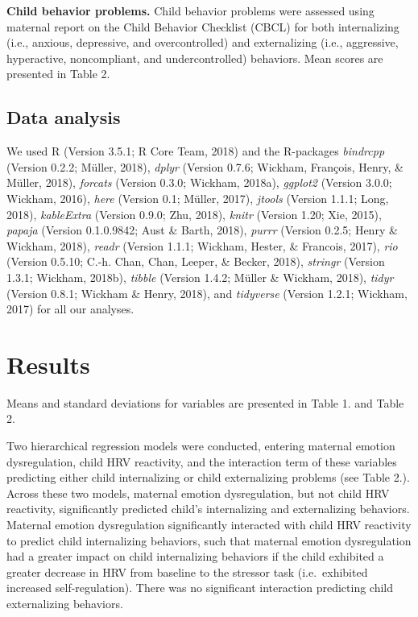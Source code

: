\documentclass[man]{apa6}
\begin{document}
\textbf{Child behavior problems.} Child behavior problems were assessed
using maternal report on the Child Behavior Checklist (CBCL) for both
internalizing (i.e., anxious, depressive, and overcontrolled) and
externalizing (i.e., aggressive, hyperactive, noncompliant, and
undercontrolled) behaviors. Mean scores are presented in Table 2.

\subsection{Data analysis}\label{data-analysis}

We used R (Version 3.5.1; R Core Team, 2018) and the R-packages
\emph{bindrcpp} (Version 0.2.2; Müller, 2018), \emph{dplyr} (Version
0.7.6; Wickham, François, Henry, \& Müller, 2018), \emph{forcats}
(Version 0.3.0; Wickham, 2018a), \emph{ggplot2} (Version 3.0.0; Wickham,
2016), \emph{here} (Version 0.1; Müller, 2017), \emph{jtools} (Version
1.1.1; Long, 2018), \emph{kableExtra} (Version 0.9.0; Zhu, 2018),
\emph{knitr} (Version 1.20; Xie, 2015), \emph{papaja} (Version
0.1.0.9842; Aust \& Barth, 2018), \emph{purrr} (Version 0.2.5; Henry \&
Wickham, 2018), \emph{readr} (Version 1.1.1; Wickham, Hester, \&
Francois, 2017), \emph{rio} (Version 0.5.10; C.-h. Chan, Chan, Leeper,
\& Becker, 2018), \emph{stringr} (Version 1.3.1; Wickham, 2018b),
\emph{tibble} (Version 1.4.2; Müller \& Wickham, 2018), \emph{tidyr}
(Version 0.8.1; Wickham \& Henry, 2018), and \emph{tidyverse} (Version
1.2.1; Wickham, 2017) for all our analyses.

\section{Results}\label{results}

Means and standard deviations for variables are presented in Table 1.
and Table 2.

Two hierarchical regression models were conducted, entering maternal
emotion dysregulation, child HRV reactivity, and the interaction term of
these variables predicting either child internalizing or child
externalizing problems (see Table 2.). Across these two models, maternal
emotion dysregulation, but not child HRV reactivity, significantly
predicted child's internalizing and externalizing behaviors. Maternal
emotion dysregulation significantly interacted with child HRV reactivity
to predict child internalizing behaviors, such that maternal emotion
dysregulation had a greater impact on child internalizing behaviors if
the child exhibited a greater decrease in HRV from baseline to the
stressor task (i.e.~exhibited increased self-regulation). There was no
significant interaction predicting child externalizing behaviors.
\end{document}

